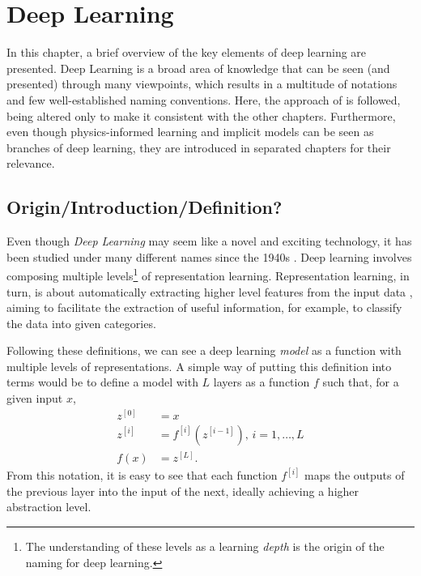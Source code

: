 \chapter{Deep Learning}\label{ch:deep-learning}

In this chapter, a brief overview of the key elements of deep learning are presented.
Deep Learning is a broad area of knowledge that can be seen (and presented) through many viewpoints, which results in a multitude of notations and few well-established naming conventions.
Here, the approach of \textcite{goodfellow_deep_2016} is followed, being altered only to make it consistent with the other chapters.
Furthermore, even though physics-informed learning and implicit models can be seen as branches of deep learning, they are introduced in separated chapters for their relevance.

\section{Origin/Introduction/Definition?}

Even though \textit{Deep Learning} may seem like a novel and exciting technology, it has been studied under many different names since the 1940s \cite{goodfellow_deep_2016}.
Deep learning involves composing multiple levels\footnote{The understanding of these levels as a learning \textit{depth} is the origin of the naming for deep learning.} of representation learning.
Representation learning, in turn, is about automatically extracting higher level features from the input data \cite{lecun_deep_2015,bengio_representation_2013}, aiming to facilitate the extraction of useful information, for example, to classify the data into given categories.

Following these definitions, we can see a deep learning \textit{model} as a function with multiple levels of representations.
A simple way of putting this definition into terms would be to define a model with $L$ layers as a function $f$ such that, for a given input $x$,
\begin{equation}\label{eq:dl-model}
\begin{split}
    z^{[0]} &= x \\
    z^{[i]} &= f^{[i]}(z^{[i-1]}),\,i=1,\ldots,L \\
    f(x) &= z^{[L]}.
\end{split}
\end{equation}
From this notation, it is easy to see that each function $f^{[i]}$ maps the outputs of the previous layer into the input of the next, ideally achieving a higher abstraction level.

